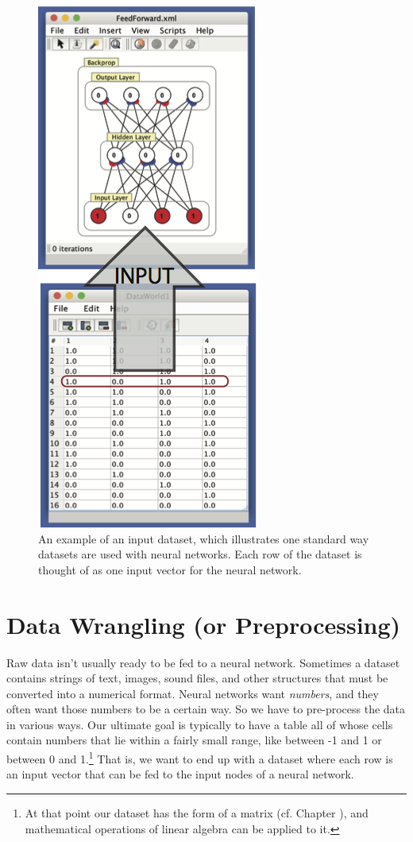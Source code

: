 \begin{figure}[h]
\centering
\includegraphics[scale=.9]{./images/dataset_inputs.png}
\caption[Simbrain screenshot with graphical elements added by Pamela Payne.]{An example of an input dataset, which illustrates one standard way datasets are used with neural networks. Each row of the dataset is thought of as one input vector for the neural network.}
\label{data_inputs}
\end{figure}

\section{Data Wrangling (or Preprocessing)}\label{wrangling}

Raw data isn't usually ready to be fed to a neural network. Sometimes a dataset contains strings of text, images, sound files, and other structures that must be converted into a numerical format. Neural networks want \emph{numbers}, and they often want those numbers to be a certain way. So we have to pre-process the data in various ways. Our ultimate goal is typically to have a table all of whose cells contain numbers that lie within a fairly small range, like between -1 and 1 or between 0 and 1.\footnote{At that point our dataset has the form of a matrix (cf. Chapter ), and mathematical operations of linear algebra can be applied to it.} That is, we want to end up with a dataset where each row is an input vector that can be fed to the input nodes of a neural network.


